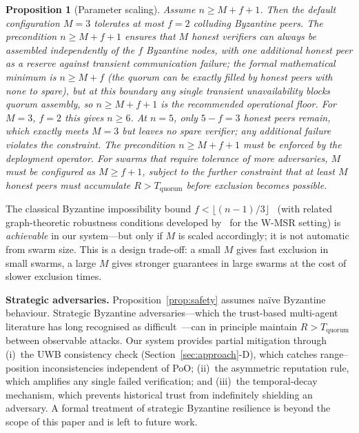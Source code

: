 \documentclass[journal,10pt,twocolumn]{IEEEtran}
\newtheorem{proposition}{Proposition}
\begin{document}
\begin{proposition}[Parameter scaling]
\label{prop:scaling}
Assume $n \geq M + f + 1$. Then the default configuration $M=3$ tolerates at most $f=2$ colluding Byzantine peers. The precondition $n \geq M+f+1$ ensures that $M$ honest verifiers can always be assembled independently of the $f$ Byzantine nodes, with one additional honest peer as a reserve against transient communication failure; the formal mathematical minimum is $n \geq M + f$ (the quorum can be exactly filled by honest peers with none to spare), but at this boundary any single transient unavailability blocks quorum assembly, so $n \geq M+f+1$ is the recommended operational floor. For $M=3$, $f=2$ this gives $n \geq 6$. At $n=5$, only $5-f=3$ honest peers remain, which exactly meets $M=3$ but leaves no spare verifier; any additional failure violates the constraint. The precondition $n \geq M+f+1$ must be enforced by the deployment operator. For swarms that require tolerance of more adversaries, $M$ must be configured as $M \geq f+1$, subject to the further constraint that at least $M$ honest peers must accumulate $R > T_\text{quorum}$ before exclusion becomes possible.
\end{proposition}

The classical Byzantine impossibility bound $f < \lfloor (n-1)/3 \rfloor$~\cite{lamport1982byzantine} (with related graph-theoretic robustness conditions developed by~\cite{leblanc2013resilient} for the W-MSR setting) is \emph{achievable} in our system---but only if $M$ is scaled accordingly; it is not automatic from swarm size. This is a design trade-off: a small $M$ gives fast exclusion in small swarms, a large $M$ gives stronger guarantees in large swarms at the cost of slower exclusion times.

\textbf{Strategic adversaries.} Proposition~\ref{prop:safety} assumes na\"ive Byzantine behaviour. Strategic Byzantine adversaries---which the trust-based multi-agent literature has long recognised as difficult~\cite{yemini2022characterizing,mallmanntrenn2022crowd}---can in principle maintain $R > T_\text{quorum}$ between observable attacks. Our system provides partial mitigation through (i)~the UWB consistency check (Section~\ref{sec:approach}-D), which catches range--position inconsistencies independent of PoO; (ii)~the asymmetric reputation rule, which amplifies any single failed verification; and (iii)~the temporal-decay mechanism, which prevents historical trust from indefinitely shielding an adversary. A formal treatment of strategic Byzantine resilience is beyond the scope of this paper and is left to future work.
\end{document}
